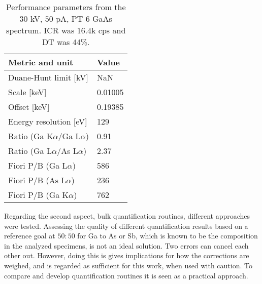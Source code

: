 \begin{table}[hbt]
    \begin{center}
        \caption{
            Performance parameters from the $30$ kV, $50$ pA, PT $6$ GaAs spectrum. ICR was $16.4$k cps and DT was 44\%.
        }
        \renewcommand*{\arraystretch}{1.1}
        \label{tab:conclusion:performance_parameters}
        \begin{tabular}{p{5cm}p{5cm}}
            \hline
            \textbf{Metric and unit}          & \textbf{Value}        \\
            \hline
            Duane-Hunt limit [kV]             & NaN                   \\
            Scale [keV]                       & 0.01005               \\
            Offset [keV]                      & 0.19385               \\
            Energy resolution [eV]            & 129                   \\
            Ratio (Ga K$\alpha$/Ga L$\alpha$) & 0.91                  \\
            Ratio (Ga L$\alpha$/As L$\alpha$) & 2.37                  \\
            Fiori P/B (Ga L$\alpha$)          & 586                   \\
            Fiori P/B (As L$\alpha$)          & 236                   \\
            Fiori P/B (Ga K$\alpha$)          & 762                   \\
            \hline
        \end{tabular}
    \end{center}
\end{table}







Regarding the second aspect, bulk quantification routines, different approaches were tested.
Assessing the quality of different quantification results based on a reference goal at $50:50$ for Ga to As or Sb, which is known to be the composition in the analyzed specimens, is not an ideal solution.
Two errors can cancel each other out.
However, doing this is gives implications for how the corrections are weighed, and is regarded as sufficient for this work, when used with caution.
To compare and develop quantification routines it is seen as a practical approach.

